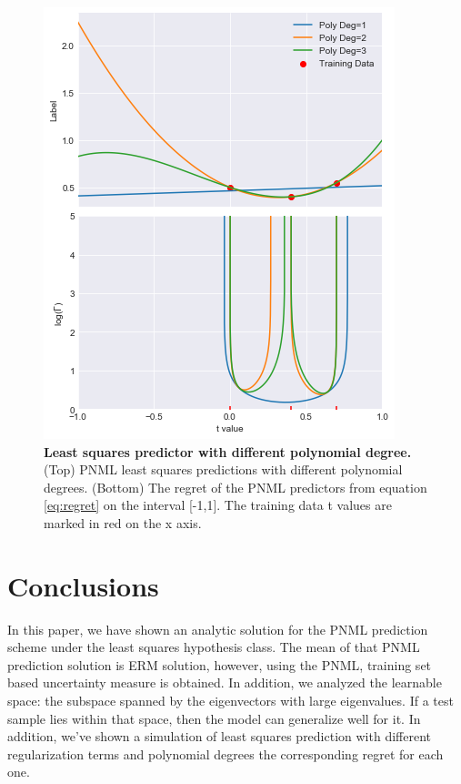 \documentclass[conference,letterpaper]{IEEEtran}
\begin{document}
\begin{figure}[h]
    \centering
    \includegraphics[width=0.98\linewidth]{figures/least_sqaures_with_poly_degree.jpg}
    \caption{\textbf{Least squares predictor with different polynomial degree.} (Top) PNML least squares predictions with different polynomial degrees. (Bottom) The regret of the PNML predictors from equation \ref{eq:regret} on the interval [-1,1]. The training data t values are marked in red on the x axis.}
    \label{fig:least_squares_with_poly}
\end{figure}


\section{Conclusions} \label{sec:conclusion}

In this paper, we have shown an analytic solution for the PNML prediction scheme under the least squares hypothesis class. The mean of that PNML prediction solution is ERM solution, however, using the PNML, training set based uncertainty measure is obtained. In addition, we analyzed the learnable space: the subspace spanned by the eigenvectors with large eigenvalues. If a test sample lies within that space, then the model can generalize well for it. 
In addition, we've shown a simulation of least squares prediction with different regularization terms and polynomial degrees the corresponding regret for each one. 
\end{document}
